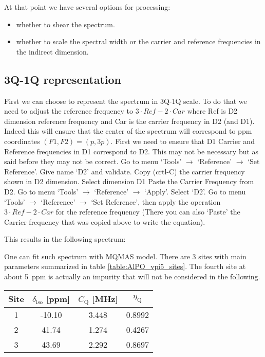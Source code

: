 \documentclass[11pt,a4paper]{article}
\begin{document}
At that point we have several options for processing\label{choice}:
\begin{itemize}
  \item whether to shear the spectrum.
  \item whether to scale the spectral width or the carrier and reference frequencies in the indirect dimension.
\end{itemize}

\subsection{3Q-1Q representation} \label{_3Q1Q}
First we can choose to represent the spectrum in 3Q-1Q scale. To do that we need to adjust the reference frequency to $3 \cdot Ref - 2 \cdot Car$
where Ref is D2 dimension reference frequency and Car is the carrier frequency in D2 (and D1). Indeed this will ensure that the center 
of the spectrum will correspond to ppm coordinates $(F1, F2)= (p, 3p)$.
First we need to ensure that D1 Carrier and Reference frequencies in D1 correspond to D2. This may not be necessary but as said before
they may not be correct.
Go to menu `Tools' $\longrightarrow$ `Reference' $\longrightarrow$ `Set Reference'. Give name `D2' and validate.
Copy (crtl-C) the carrier frequency shown in D2 dimension. 
Select dimension D1
Paste the Carrier Frequency from D2.
Go to menu `Tools' $\longrightarrow$ `Reference' $\longrightarrow$ `Apply'. Select `D2'.
Go to menu `Tools' $\longrightarrow$ `Reference' $\longrightarrow$ `Set Reference', then apply the operation $3 \cdot Ref - 2 \cdot Car$ for 
the reference frequency (There you can also `Paste' the Carrier frequency that was copied above to write the equation).

This results in the following spectrum:
\begin{center}
\end{center}

One can fit such spectrum with MQMAS model. There are 3 sites with main parameters summarized in table \ref{table:AlPO_vpi5_sites}. The fourth site
at about 5~ppm is actually an impurity that will not be considered in the following.

\begin{center}\label{table:AlPO_vpi5_sites}
  \begin{tabular}{c|c c c} 
	 \toprule
	 Site & $\delta_\text{iso}$ [ppm]& $C_\text{Q}$ [MHz] & $\eta_\text{Q}$ \\
	 \midrule
 1 & -10.10      &   3.448     &          0.8992       \\
 2 &  41.74      &   1.274     &          0.4267       \\
 3 &  43.69      &   2.292     &          0.8697       \\
	\bottomrule
  \end{tabular}
\end{center}
\end{document}
